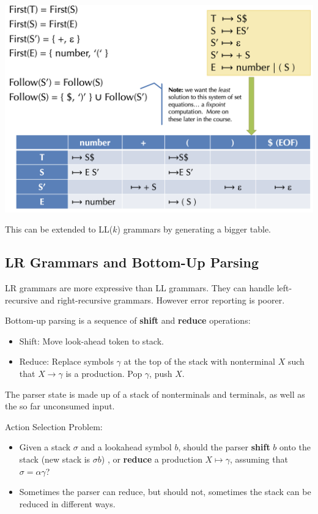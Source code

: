 \begin{center}
	\includegraphics[width=\linewidth]{assets/ll1.png}
\end{center}

This can be extended to LL($k$) grammars by generating a bigger table.


\subsection*{LR Grammars and Bottom-Up Parsing}

LR grammars are more expressive than LL grammars. They can handle left-recursive and right-recursive grammars. However error reporting is poorer. \medskip

Bottom-up parsing is a sequence of \textbf{shift} and \textbf{reduce} operations:
\begin{itemize}
	\item Shift: Move look-ahead token to stack.
	
	\item Reduce: Replace symbols $\gamma$ at the top of the stack with nonterminal $X$ such that $X \to \gamma$ is a production. Pop $\gamma$, push $X$.
\end{itemize}

The parser state is made up of a stack of nonterminals and terminals, as well as the so far unconsumed input.\medskip
			
Action Selection Problem:
\begin{itemize}
	\item Given a stack $\sigma$ and a lookahead symbol $b$, should the parser \textbf{shift} $b$ onto the stack (new stack is $\sigma b$) , or \textbf{reduce} a production $X \mapsto \gamma$, assuming that $\sigma = \alpha \gamma$?
	
	\item Sometimes the parser can reduce, but should not, sometimes the stack can be reduced in different ways.
\end{itemize}

